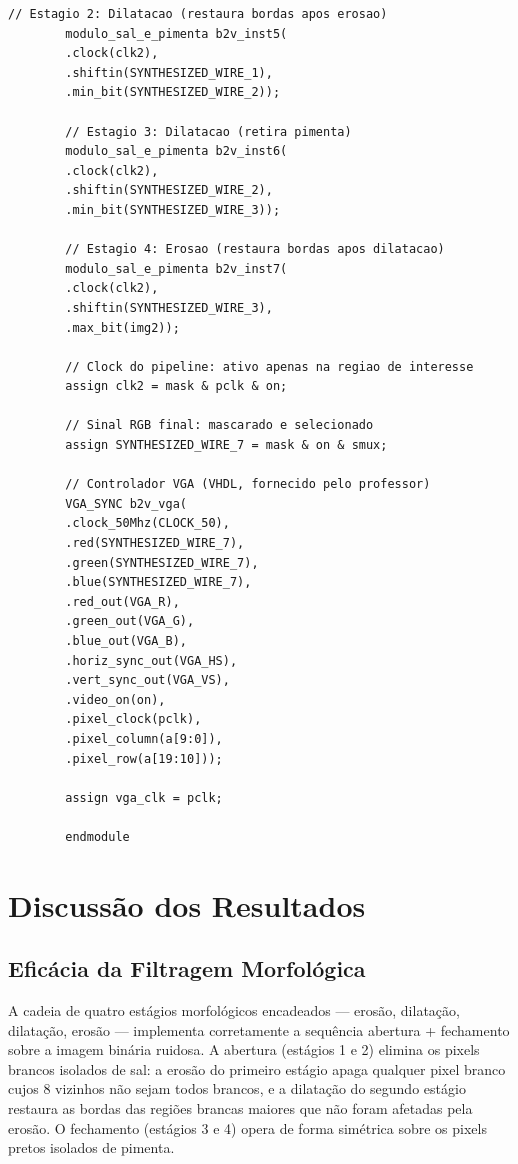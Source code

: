 \documentclass[12pt, a4paper]{article}
\begin{document}
\begin{lstlisting}[style=verilog, caption={\texttt{vga\_filtro.v} --- Módulo \textit{top-level} gerado pelo editor BDF do Quartus Prime.}, label={lst:top}]
		// Estagio 2: Dilatacao (restaura bordas apos erosao)
		modulo_sal_e_pimenta b2v_inst5(
		.clock(clk2),
		.shiftin(SYNTHESIZED_WIRE_1),
		.min_bit(SYNTHESIZED_WIRE_2));
		
		// Estagio 3: Dilatacao (retira pimenta)
		modulo_sal_e_pimenta b2v_inst6(
		.clock(clk2),
		.shiftin(SYNTHESIZED_WIRE_2),
		.min_bit(SYNTHESIZED_WIRE_3));
		
		// Estagio 4: Erosao (restaura bordas apos dilatacao)
		modulo_sal_e_pimenta b2v_inst7(
		.clock(clk2),
		.shiftin(SYNTHESIZED_WIRE_3),
		.max_bit(img2));
		
		// Clock do pipeline: ativo apenas na regiao de interesse
		assign clk2 = mask & pclk & on;
		
		// Sinal RGB final: mascarado e selecionado
		assign SYNTHESIZED_WIRE_7 = mask & on & smux;
		
		// Controlador VGA (VHDL, fornecido pelo professor)
		VGA_SYNC b2v_vga(
		.clock_50Mhz(CLOCK_50),
		.red(SYNTHESIZED_WIRE_7),
		.green(SYNTHESIZED_WIRE_7),
		.blue(SYNTHESIZED_WIRE_7),
		.red_out(VGA_R),
		.green_out(VGA_G),
		.blue_out(VGA_B),
		.horiz_sync_out(VGA_HS),
		.vert_sync_out(VGA_VS),
		.video_on(on),
		.pixel_clock(pclk),
		.pixel_column(a[9:0]),
		.pixel_row(a[19:10]));
		
		assign vga_clk = pclk;
		
		endmodule
	\end{lstlisting}
	
	\section{Discussão dos Resultados}
	
	\subsection{Eficácia da Filtragem Morfológica}
	
	A cadeia de quatro estágios morfológicos encadeados --- erosão, dilatação,
	dilatação, erosão --- implementa corretamente a sequência abertura + fechamento
	sobre a imagem binária ruidosa. A abertura (estágios 1 e 2) elimina os pixels
	brancos isolados de sal: a erosão do primeiro estágio apaga qualquer pixel branco
	cujos 8 vizinhos não sejam todos brancos, e a dilatação do segundo estágio
	restaura as bordas das regiões brancas maiores que não foram afetadas pela erosão.
	O fechamento (estágios 3 e 4) opera de forma simétrica sobre os pixels pretos
	isolados de pimenta.
	
\end{document}
